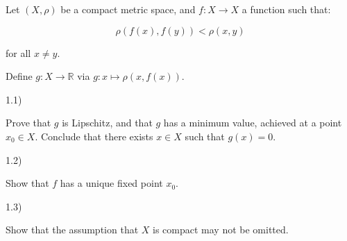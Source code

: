 \documentclass[10pt]{article}
\newenvironment{problem}[2][]{\begin{trivlist}
\item[\hskip \labelsep {\bfseries #1}\hskip \labelsep {\bfseries #2.}]}{\end{trivlist}}
\begin{document}
\begin{problem}{Question 1}

Let $(X, \rho)$ be a compact metric space, and $f: X \to X$ a function such that:

$$ \rho(f(x), f(y)) < \rho(x,y) $$

for all $x \not = y$.

Define $g: X \to \mathbb{R}$ via $g: x \mapsto \rho(x, f(x))$.

1.1)

Prove that $g$ is Lipschitz, and that $g$ has a minimum value, achieved at a point $x_0 \in X$. Conclude that there exists $x \in X$ such that $g(x) = 0$.

1.2)

Show that $f$ has a unique fixed point $x_0$.

1.3)

Show that the assumption that $X$ is compact may not be omitted.

\end{problem}
\end{document}

